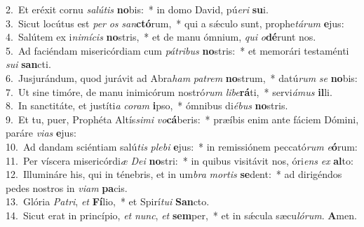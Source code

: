 {2.~}Et eréxit cornu \textit{sa}\textit{lú}\textit{tis} \textbf{no}bis:~* in domo David, pú\textit{e}\textit{ri} \textbf{su}i.\\
{3.~}Sicut locútus est \textit{per} \textit{os} \textit{san}\textbf{ctó}rum,~* qui a sǽculo sunt, prophe\textit{tá}\textit{rum} \textbf{e}jus:\\
{4.~}Salútem ex i\textit{ni}\textit{mí}\textit{cis} \textbf{no}stris,~* et de manu ómnium, \textit{qui} \textit{o}\textbf{dé}runt nos.\\
{5.~}Ad faciéndam misericórdiam cum \textit{pá}\textit{tri}\textit{bus} \textbf{no}stris:~* et memorári testaménti \textit{su}\textit{i} \textbf{san}cti.\\
{6.~}Jusjurándum, quod jurávit ad Abra\textit{ham} \textit{pa}\textit{trem} \textbf{no}strum,~* datú\textit{rum} \textit{se} \textbf{no}bis:\\
{7.~}Ut sine timóre, de manu inimicórum nostró\textit{rum} \textit{li}\textit{be}\textbf{rá}ti,~* servi\textit{á}\textit{mus} \textbf{il}li.\\
{8.~}In sanctitáte, et justíti\textit{a} \textit{co}\textit{ram} \textbf{i}pso,~* ómnibus di\textit{é}\textit{bus} \textbf{no}stris.\\
{9.~}Et tu, puer, Prophéta Altís\textit{si}\textit{mi} \textit{vo}\textbf{cá}beris:~* præíbis enim ante fáciem Dómini, paráre \textit{vi}\textit{as} \textbf{e}jus:\\
{10.~}Ad dandam sciéntiam salú\textit{tis} \textit{ple}\textit{bi} \textbf{e}jus:~* in remissiónem peccató\textit{rum} \textit{e}\textbf{ó}rum:\\
{11.~}Per víscera misericórdi\textit{æ} \textit{De}\textit{i} \textbf{no}stri:~* in quibus visitávit nos, óri\textit{ens} \textit{ex} \textbf{al}to:\\
{12.~}Illumináre his, qui in ténebris, et in um\textit{bra} \textit{mor}\textit{tis} \textbf{se}dent:~* ad dirigéndos pedes nostros in \textit{vi}\textit{am} \textbf{pa}cis.\\
{13.~}Glória \textit{Pa}\textit{tri}, \textit{et} \textbf{Fí}lio,~* et Spirí\textit{tu}\textit{i} \textbf{San}cto.\\
{14.~}Sicut erat in princípio, \textit{et} \textit{nunc}, \textit{et} \textbf{sem}per,~* et in sǽcula sæcu\textit{ló}\textit{rum}. \textbf{A}men.\\
